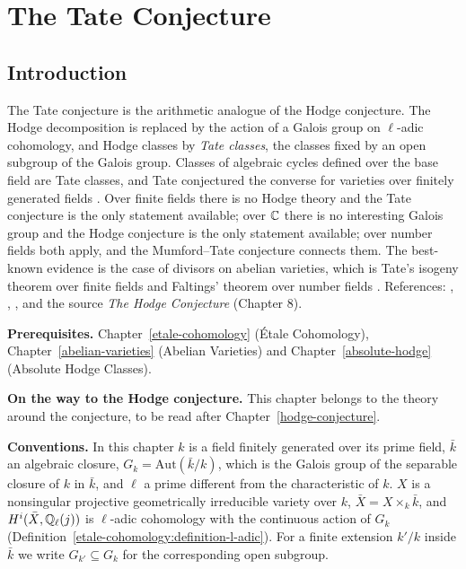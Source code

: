 \chapter{The Tate Conjecture}\label{tate-conjecture}

\section{Introduction}\label{tate-conjecture:section-introduction}

The Tate conjecture is the arithmetic analogue of the Hodge conjecture. The Hodge decomposition is replaced by the action of a Galois group on $\ell$-adic cohomology, and Hodge classes by
\emph{Tate classes}, the classes fixed by an open subgroup of the Galois group. Classes of algebraic cycles defined over the base field are Tate classes, and Tate conjectured the converse for
varieties over finitely generated fields \cite{tate-1965}. Over finite fields there is no Hodge theory and the Tate conjecture is the only statement available; over $\mathbb{C}$ there is no interesting Galois
group and the Hodge conjecture is the only statement available; over number fields both apply, and the Mumford--Tate conjecture connects them. The best-known evidence is the case of divisors on abelian
varieties, which is Tate's isogeny theorem over finite fields \cite{tate-1966} and Faltings' theorem over number fields \cite{faltings-1983}. References: \cite{tate-1965}, \cite{totaro-2017},
\cite{milne-etale}, and the source \emph{The Hodge Conjecture} (Chapter 8).

\noindent\textbf{Prerequisites.} Chapter~\ref{etale-cohomology} (\'Etale Cohomology), Chapter~\ref{abelian-varieties} (Abelian Varieties) and Chapter~\ref{absolute-hodge} (Absolute Hodge Classes).

\noindent\textbf{On the way to the Hodge conjecture.} This chapter belongs to the theory around the conjecture, to be read after Chapter~\ref{hodge-conjecture}.

\noindent\textbf{Conventions.} In this chapter $k$ is a field finitely generated over its prime field, $\bar k$ an algebraic closure, $G_k = \mathrm{Aut}(\bar k/k)$, which is the Galois group of the separable
closure of $k$ in $\bar k$, and $\ell$ a prime different from the characteristic of $k$. $X$ is a nonsingular projective geometrically irreducible variety over $k$, $\bar X = X \times_k\bar k$, and $H^i(\bar X, \mathbb{Q}_\ell(j))$ is $\ell$-adic cohomology with the continuous
action of $G_k$ (Definition~\ref{etale-cohomology:definition-l-adic}). For a finite extension $k'/k$ inside $\bar k$ we write $G_{k'} \subseteq G_k$ for the corresponding open subgroup.

